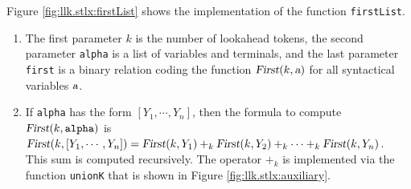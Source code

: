 Figure \ref{fig:llk.stlx:firstList} shows the implementation of the function \texttt{firstList}.
\begin{enumerate}
\item The first parameter $k$ is the number of lookahead tokens, the second parameter \texttt{alpha}
      is a list of variables and terminals, and the last parameter \texttt{first} is a binary
      relation coding the function $\textsl{First}(k, \textsl{a})$ for all syntactical variables $\textsl{a}$.
\item If \texttt{alpha} has the form $[Y_1, \cdots, Y_n]$, then the formula to compute
      $\textsl{First}(k,\mathtt{alpha})$ is
      \\[0.2cm]
      \hspace*{1.3cm}
      $\textsl{First}(k,[Y_1, \cdots, Y_n]) =  \textsl{First}(k, Y_1) +_k \textsl{First}(k, Y_2) +_k \cdots +_k \textsl{First}(k, Y_n)$.
      \\[0.2cm]
      This sum is computed recursively.  The operator $+_k$ is implemented via the function
      \texttt{unionK} that is shown in Figure \ref{fig:llk.stlx:auxiliary}.
\end{enumerate}

